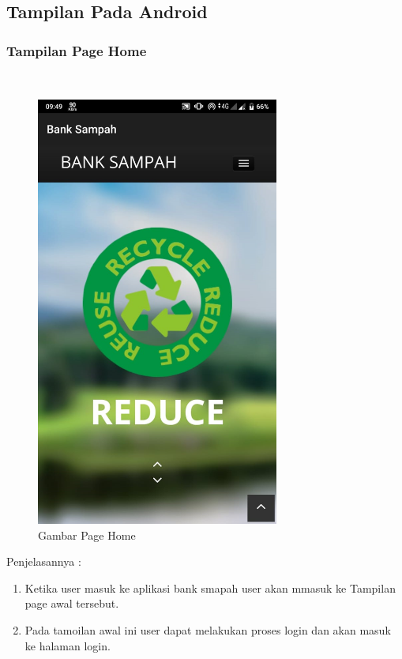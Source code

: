 \subsection{Tampilan Pada Android}
\subsubsection{Tampilan Page Home}
\hfill\\
	\begin{figure}[H]
		\includegraphics[width=8cm]{figures/analisis/32.png}
		\centering
		\caption{Gambar Page Home}
	\end{figure}
Penjelasannya :
\begin{enumerate}
\item Ketika user masuk ke aplikasi bank smapah user akan mmasuk ke Tampilan page awal tersebut.
\item Pada tamoilan awal ini user dapat melakukan proses login dan akan masuk ke halaman login.
\end{enumerate}

